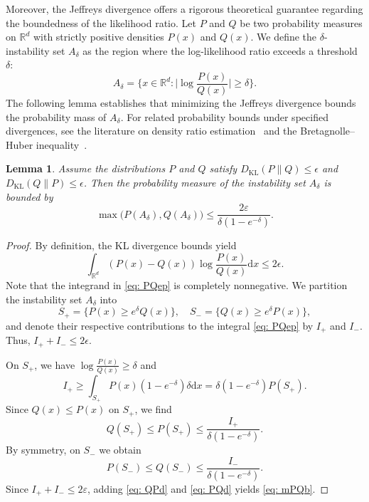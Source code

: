\documentclass[%
 reprint,
 amsmath,amssymb,
 aps,
 pre,
]{revtex4-2}
\newtheorem{lemma}{Lemma}
\DeclareMathOperator{\KL}{KL}
\newcommand{\D}{\mathrm{d}}
\newcommand{\Ge}{\geqslant}
\newcommand{\Le}{\leqslant}
\newcommand{\ep}{\varepsilon}
\begin{document}
Moreover, the Jeffreys divergence offers a rigorous theoretical guarantee regarding the boundedness of the likelihood ratio. Let $P$ and $Q$ be two probability measures on $\mathbb R^d$ with strictly positive densities $P(x)$ and $Q(x)$. We define the $\delta$-instability set $A_\delta$ as the region where the log-likelihood ratio exceeds a threshold $\delta$:
\begin{equation}
	A_\delta = \bigg\{x\in\mathbb R^d:
	\bigg|\log \frac{P(x)}{Q(x)}\bigg| \Ge \delta
	\bigg\}.
\end{equation}
The following lemma establishes that minimizing the Jeffreys divergence  bounds the probability mass of $A_\delta$. For related probability bounds under specified divergences, see the literature on density ratio estimation~\cite{sugiyama2012density} and the Bretagnolle--Huber inequality~\cite{tsybakov2008nonparametric}.
\begin{lemma}
	\label{lemma: concentration}
	Assume the distributions $P$ and $Q$ satisfy $D_{\KL}(P\|Q) \Le \epsilon$ and $D_{\KL}(Q\|P) \Le \epsilon$. Then the probability measure of the instability set $A_\delta$ is bounded by
	\begin{equation}
		\max\big(P(A_\delta),Q(A_\delta)\big) \Le \frac{2\ep}{\delta(1-e^{-\delta})}.
		\label{eq: mPQb}
	\end{equation}
\end{lemma}
\begin{proof}
By definition, the KL divergence bounds yield
\begin{equation}
\int_{\mathbb R^d} (P(x) - Q(x))\log\frac{P(x)}{Q(x)} \D x \Le 2\epsilon.
\label{eq: PQep}
\end{equation}
Note that the integrand in \eqref{eq: PQep} is completely nonnegative. We partition the instability set $A_\delta$ into
\begin{equation*}
	S_+ = \{P(x) \Ge e^\delta Q(x)\}, \quad S_- = \{Q(x) \Ge e^\delta P(x)\},
\end{equation*}
and denote their respective contributions to the integral \eqref{eq: PQep} by $I_+$ and $I_-$. Thus, $I_++I_-\Le 2\epsilon$.

On $S_+$, we have $\log\frac{P(x)}{Q(x)} \Ge \delta$ and
\begin{equation*}
	I_+ \Ge \int_{S_+} P(x)(1-e^{-\delta})\delta \D x = \delta(1-e^{-\delta})P(S_+).
\end{equation*}
Since $Q(x) \Le P(x)$ on $S_+$, we find
\begin{equation}
	Q(S_+) \Le P(S_+) \Le \frac{I_+}{\delta(1-e^{-\delta})}.
	\label{eq: QPd}
\end{equation}
By symmetry, on $S_-$ we obtain
\begin{equation}
	P(S_-) \Le Q(S_-) \Le \frac{I_-}{\delta(1-e^{-\delta})}.
	\label{eq: PQd}
\end{equation}
Since $I_++I_-\Le 2\ep$, adding \eqref{eq: QPd} and \eqref{eq: PQd} yields \eqref{eq: mPQb}.
\end{proof}
\end{document}
